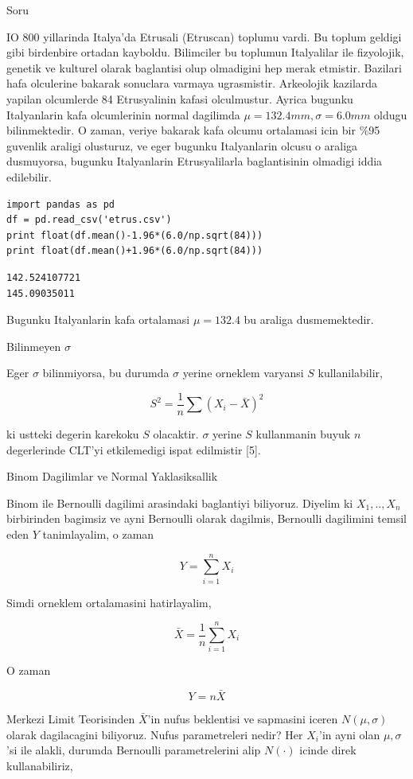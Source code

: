 \documentclass[12pt,fleqn]{article}\usepackage{../common}
\begin{document}
Soru

IO 800 yillarinda Italya'da Etrusali (Etruscan) toplumu vardi. Bu toplum
geldigi gibi birdenbire ortadan kayboldu. Bilimciler bu toplumun
Italyalilar ile fizyolojik, genetik ve kulturel olarak baglantisi olup
olmadigini hep merak etmistir. Bazilari hafa olculerine bakarak sonuclara
varmaya ugrasmistir. Arkeolojik kazilarda yapilan olcumlerde 84
Etrusyalinin kafasi olculmustur. Ayrica bugunku Italyanlarin kafa
olcumlerinin normal dagilimda $\mu=132.4 mm,\sigma=6.0mm$ oldugu
bilinmektedir. O zaman, veriye bakarak kafa olcumu ortalamasi icin bir
\%95 guvenlik araligi olusturuz, ve eger bugunku Italyanlarin olcusu o
araliga dusmuyorsa, bugunku Italyanlarin Etrusyalilarla baglantisinin
olmadigi iddia edilebilir. 

\begin{verbatim}
import pandas as pd
df = pd.read_csv('etrus.csv')
print float(df.mean()-1.96*(6.0/np.sqrt(84)))
print float(df.mean()+1.96*(6.0/np.sqrt(84)))
\end{verbatim}

\begin{verbatim}
142.524107721
145.09035011
\end{verbatim}

Bugunku Italyanlarin kafa ortalamasi $\mu=132.4$ bu araliga dusmemektedir.

Bilinmeyen $\sigma$

Eger $\sigma$ bilinmiyorsa, bu durumda $\sigma$ yerine orneklem varyansi
$S$ kullanilabilir, 

$$ S^2 = \frac{1}{n} \sum (X_i - \bar{X})^2
$$

ki ustteki degerin karekoku $S$ olacaktir. $\sigma$ yerine $S$ kullanmanin 
buyuk $n$ degerlerinde CLT'yi etkilemedigi ispat edilmistir [5]. 


Binom Dagilimlar ve Normal Yaklasiksallik

Binom ile Bernoulli dagilimi arasindaki baglantiyi biliyoruz. Diyelim ki
$X_1,..,X_n$ birbirinden bagimsiz ve ayni Bernoulli olarak dagilmis,
Bernoulli dagilimini temsil eden $Y$ tanimlayalim, o zaman

$$ Y = \sum_{i=1}^n X_i $$

Simdi orneklem ortalamasini hatirlayalim,

$$ \bar{X} = \frac{1}{n}  \sum_{i=1}^n X_i $$

O zaman 

$$ Y = n\bar{X}  $$

Merkezi Limit Teorisinden $\bar{X}$'in nufus beklentisi ve sapmasini iceren
$N(\mu,\sigma)$ olarak dagilacagini biliyoruz. Nufus parametreleri nedir?
Her $X_i$'in ayni olan $\mu,\sigma$'si ile alakli, durumda Bernoulli
parametrelerini alip $N(\cdot)$ icinde direk kullanabiliriz, 
\end{document}
